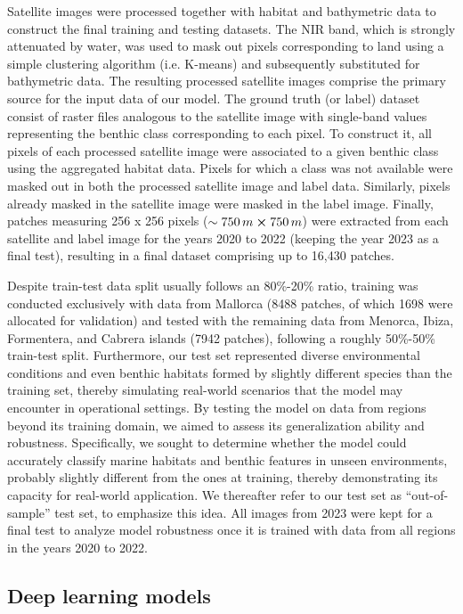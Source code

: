 Satellite images were processed together with habitat and bathymetric data to
construct the final training and testing datasets. The NIR band, which is
strongly attenuated by water, was used to mask out pixels corresponding to land
using a simple clustering algorithm (i.e. K-means) and subsequently substituted
for bathymetric data. The resulting processed
satellite images comprise the primary source for the input data of our model.
The ground truth (or label) dataset consist of raster files analogous to the
satellite image with single-band values representing the benthic class
corresponding to each pixel. To construct it, all pixels of each processed
satellite image were associated to a given benthic class using the aggregated
habitat data. Pixels for which a class was not available were masked out in
both the processed satellite image and label data. Similarly, pixels already
masked in the satellite image were masked in the label image. Finally, patches
measuring 256 x 256 pixels ($\sim 750\,m \cross 750\,m$) were extracted from
each satellite and label image for the years 2020 to 2022 (keeping the year
2023 as a final test), resulting in a final dataset comprising up to
16,430 patches.

Despite train-test data split usually follows an 80\%-20\% ratio, training was
conducted exclusively with data from Mallorca (8488
patches, of which 1698 were allocated for validation) and tested with the
remaining data from Menorca, Ibiza, Formentera, and Cabrera islands (7942
patches), following a roughly 50\%-50\% train-test split. Furthermore, our
test set represented diverse environmental conditions and even benthic habitats
formed by slightly different species than the training set, thereby simulating
real-world scenarios that the model may encounter in operational settings. By
testing the model on data from regions beyond its training domain, we aimed to
assess its generalization ability and robustness. Specifically, we sought to
determine whether the model could accurately classify marine habitats and
benthic features in unseen environments, probably slightly different from the
ones at training, thereby demonstrating its capacity for real-world
application. We thereafter refer to our test set as ``out-of-sample'' test set,
to emphasize this idea. All images from 2023 were kept for a final test to
analyze model robustness once it is trained with data from all regions in the
years 2020 to 2022.

\subsection{Deep learning models}

